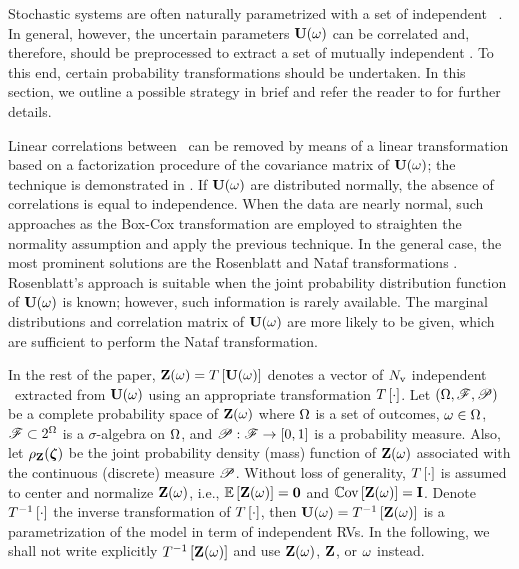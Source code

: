 Stochastic systems are often naturally parametrized with a set of independent \rvs\ \cite{xiu2010}. In general, however, the uncertain parameters $\mathbf{U}(\omega)$ can be correlated and, therefore, should be preprocessed to extract a set of mutually independent \rvs. To this end, certain probability transformations should be undertaken. In this section, we outline a possible strategy in brief and refer the reader to \cite{xiu2010, eldred2009} for further details.

Linear correlations between \rvs\ can be removed by means of a linear transformation based on a factorization procedure of the covariance matrix of $\mathbf{U}(\omega)$; the technique is demonstrated in . If $\mathbf{U}(\omega)$ are distributed normally, the absence of correlations is equal to independence. When the data are nearly normal, such approaches as the Box-Cox transformation are employed to straighten the normality assumption and apply the previous technique. In the general case, the most prominent solutions are the Rosenblatt and Nataf transformations \cite{eldred2009}. Rosenblatt's approach is suitable when the joint probability distribution function of $\mathbf{U}(\omega)$ is known; however, such information is rarely available. The marginal distributions and correlation matrix of $\mathbf{U}(\omega)$ are more likely to be given, which are sufficient to perform the Nataf transformation.

In the rest of the paper, $\mathbf{Z}(\omega) = T\left[\mathbf{U}(\omega)\right]$ denotes a vector of ${N_\text{v}}$ independent \rvs\ extracted from $\mathbf{U}(\omega)$ using an appropriate transformation $T\left[\cdot\right]$. Let $(\Omega, \mathscr{F}, \mathscr{P})$ be a complete probability space \cite{durrett2010} of $\mathbf{Z}(\omega)$ where $\Omega$ is a set of outcomes, $\omega \in \Omega$, $\mathscr{F} \subset 2^\Omega$ is a $\sigma$-algebra on $\Omega$, and $\mathscr{P}: \mathscr{F} \to [0, 1]$ is a probability measure. Also, let $\rho_{\mathbf{Z}}(\boldsymbol{\zeta})$ be the joint probability density (mass) function of $\mathbf{Z}(\omega)$ associated with the continuous (discrete) measure $\mathscr{P}$. Without loss of generality, $T\left[\cdot\right]$ is assumed to center and normalize $\mathbf{Z}(\omega)$, i.e., $\oExp{\vZ(\o)} = \mZero$ and $\oCov{\vZ(\o)} = \mI$. Denote $T^{-1}\left[\cdot\right]$ the inverse transformation of $T\left[\cdot\right]$, then $\mathbf{U}(\omega) = T^{-1}\left[\mathbf{Z}(\omega)\right]$ is a parametrization of the model in term of independent RVs. In the following, we shall not write explicitly $T^{-1}\left[\mathbf{Z}(\omega)\right]$ and use $\mathbf{Z}(\omega)$, $\mathbf{Z}$, or $\omega$ instead.
